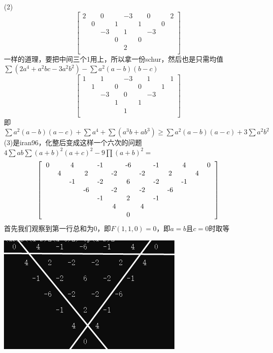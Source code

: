 \documentclass[UTF8]{ctexart}
\begin{document}
(2)\renewcommand*{\arraystretch}{1.732}\[\left[\begin{matrix}
	2& &0& &-3& &0& &2\\
	&0& &1& &1& &0&\\
	& &-3& &1& &-3& &\\
	& & &0& &0& & &\\
	& & & &2& & & &\\
\end{matrix}\right]\]
一样的道理，要把中间三个1用上，所以拿一份schur，然后也是只需均值\\
$ \displaystyle  \sum (2a^{4}+a^{2}bc-3a^{2}b^{2})-\displaystyle  \sum a^{2}(a-b)(b-c) $
\renewcommand*{\arraystretch}{1.732}\[\left[\begin{matrix}
	1& &1& &-3& &1& &1\\
	&1& &0& &0& &1&\\
	& &-3& &0& &-3& &\\
	& & &1& &1& & &\\
	& & & &1& & & &\\
\end{matrix}\right]\]
即$ \displaystyle \sum a^{2}(a-b)(a-c)+\displaystyle \sum a^{4}+\displaystyle \sum (a^{3}b+ab^{3})\geq \displaystyle \sum a^{2}(a-b)(a-c)+3\displaystyle \sum a^{2}b^{2}$\\
(3)是iran96，化整后变成这样一个六次的问题\\
$ 4\displaystyle \sum ab\displaystyle \sum (a+b)^{2}(a+c)^{2}-9\prod (a+b)^{2}= $
\renewcommand*{\arraystretch}{1.732}\[\left[\begin{matrix}
	\begin{tabular}{ccccccccccccc}
		0& &4& &-1& &-6& &-1& &4& &0\\
		&4& &2& &-2& &-2& &2& &4&\\
		& &-1& &-2& &6& &-2& &-1& &\\
		& & &-6& &-2& &-2& &-6& & &\\
		& & & &-1& &2& &-1& & & &\\
		& & & & &4& &4& & & & &\\
		& & & & & &0& & & & & &\\
	\end{tabular}
\end{matrix}\right]\]
首先我们观察到第一行总和为$ 0 $，即$ F(1,1,0)=0 $，即$ a=b $且$ c=0 $时取等
\begin{center}
	\includegraphics[width=0.4\linewidth]{22}
\end{center}
\end{document}
